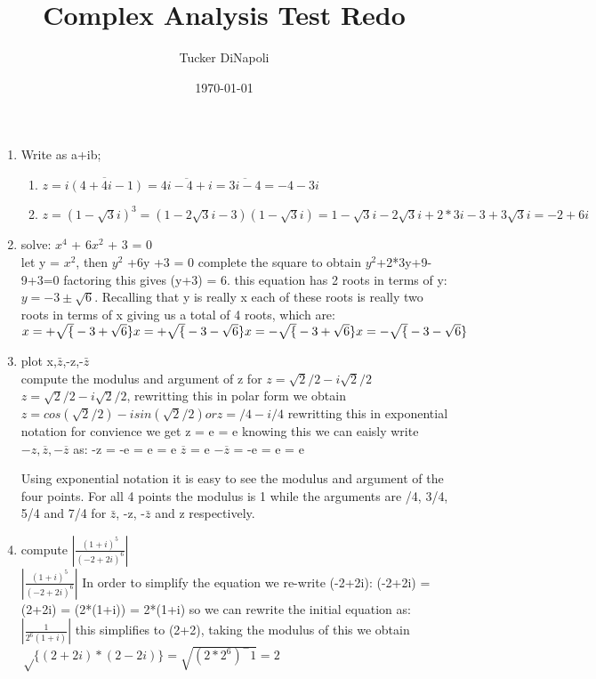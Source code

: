 \documentclass[11pt]{article}
\author{Tucker DiNapoli}
\date{\today}
\title{Complex Analysis Test Redo}
\begin{document}
\maketitle
\begin{enumerate}
\item Write as a+ib;\\
\begin{enumerate}
  \item \(z = \overline{i(4+4i-1)} = \overline{4i-4+i} = \overline{3i-4} = -4-3i\)\\
  \item \(z = (1-\sqrt{3}i)^{3} = (1-2\sqrt{3}i-3)(1-\sqrt{3}i) =
  1-\sqrt{3}i-2\sqrt{3}i + 2*3i-3 + 3\sqrt{3}i = -2+6i\)
\end{enumerate}

\item solve: \(x^{\text{4}}\) + \(6x^{\text{2}}\) + 3 = 0\\
  let y = \(x^{\text{2}}\), then \(y^{\text{2}}\) +6y +3 = 0
complete the square to obtain \(y^{\text{2}}\)+2*3y+9-9+3=0 factoring this gives
(y+3) = 6. this equation has 2 roots in terms of y:
\(y = -3 \pm \sqrt{6}.\) Recalling that y is really x each of these roots is really
two roots in terms of x giving us a total of 4 roots, which are:\\
\(x = +\sqrt\{-3+\sqrt{6}\}\\
  x = +\sqrt\{-3-\sqrt{6}\}\\
  x = -\sqrt\{-3+\sqrt{6}\}\\
  x = -\sqrt\{-3-\sqrt{6}\}\\\)

\item plot x,\(\bar{z}\),-z,-\(\bar{z}\)\\
  compute the modulus and argument of z for \(z = \sqrt{2}/2 -i\sqrt{2}/2\)
\(z = \sqrt{2}/2 -i\sqrt{2}/2\), rewritting this in polar form we obtain
\(z = cos(\sqrt{2}/2) -isin(\sqrt{2}/2) or z = /4 -i/4\)
rewritting this in exponential notation for convience we get z = e =
e knowing this we can eaisly write \(-z,\overline{z},-\overline{z}\) as:
-z = -e = e = e
\(\overline{z}\) = e
\(-\overline{z}\) = -e = e = e

Using exponential notation it is easy to see the modulus and argument of the
four points. For all 4 points the modulus is 1 while the arguments are /4,
3/4, 5/4 and 7/4 for \(\bar{z}\), -z, -\(\bar{z}\) and z respectively.

\item compute \(|\frac{(1+i)^{5}}{(-2+2i)^{6}}|\)\\
  \(|\frac{(1+i)^5}{(-2+2i)^6}|\)
In order to simplify the equation we re-write (-2+2i):
(-2+2i) = (2+2i) = (2*(1+i)) = 2*(1+i)
so we can rewrite the initial equation as: \(|\frac{1}{2^6(1+i)}|\)
this simplifies to (2+2), taking the modulus of this we obtain
\(\sqrt\{(2+2i)*(2-2i)\} = \sqrt{(2*2^6)^-1} = 2\)


\end{enumerate}
\end{document}
